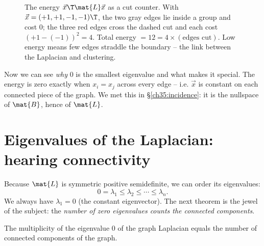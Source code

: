 \begin{figure}[H]
\centering
{}
\caption{The energy $\vec{x}\T\mat{L}\vec{x}$ as a cut counter. With $\vec{x}=(+1,+1,-1,-1)\T$,
the two gray edges lie inside a group and cost $0$; the three red edges cross the dashed cut
and each cost $(+1-(-1))^2 = 4$. Total energy $= 12 = 4 \times (\text{edges cut})$. Low energy
means few edges straddle the boundary -- the link between the Laplacian and clustering.}
\label{ch35:fig-cut}
\end{figure}

Now we can see \emph{why} $0$ is the smallest eigenvalue and what makes it special. The
energy is zero exactly when $x_i = x_j$ across every edge -- i.e. $\vec{x}$ is constant on
each connected piece of the graph. We met this in \S\ref{ch35:incidence}: it is the
nullspace of $\mat{B}$, hence of $\mat{L}$.

\section{Eigenvalues of the Laplacian: hearing connectivity}
\label{ch35:spectrum}

Because $\mat{L}$ is symmetric positive semidefinite, we can order its eigenvalues:
\[
0 = \lambda_1 \le \lambda_2 \le \cdots \le \lambda_n.
\]
We always have $\lambda_1 = 0$ (the constant eigenvector). The next theorem is the jewel of
the subject: the \emph{number of zero eigenvalues counts the connected components}.

\begin{theorem}[Multiplicity of zero $=$ number of components]
\label{ch35:thm-components}
The multiplicity of the eigenvalue $0$ of the graph Laplacian equals the number of
connected components of the graph.
\end{theorem}

